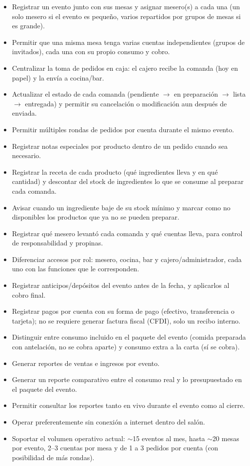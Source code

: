 \begin{itemize}
    \item Registrar un evento junto con sus mesas y asignar mesero(s) a cada una (un solo mesero si el evento es pequeño, varios repartidos por grupos de mesas si es grande).
    \item Permitir que una misma mesa tenga varias cuentas independientes (grupos de invitados), cada una con su propio consumo y cobro.
    \item Centralizar la toma de pedidos en caja: el cajero recibe la comanda (hoy en papel) y la envía a cocina/bar.
    \item Actualizar el estado de cada comanda (pendiente $\rightarrow$ en preparación $\rightarrow$ lista $\rightarrow$ entregada) y permitir su cancelación o modificación aun después de enviada.
    \item Permitir múltiples rondas de pedidos por cuenta durante el mismo evento.
    \item Registrar notas especiales por producto dentro de un pedido cuando sea necesario.
    \item Registrar la receta de cada producto (qué ingredientes lleva y en qué cantidad) y descontar del stock de ingredientes lo que se consume al preparar cada comanda.
    \item Avisar cuando un ingrediente baje de su stock mínimo y marcar como no disponibles los productos que ya no se pueden preparar.
    \item Registrar qué mesero levantó cada comanda y qué cuentas lleva, para control de responsabilidad y propinas.
    \item Diferenciar accesos por rol: mesero, cocina, bar y cajero/administrador, cada uno con las funciones que le corresponden.
    \item Registrar anticipos/depósitos del evento antes de la fecha, y aplicarlos al cobro final.
    \item Registrar pagos por cuenta con su forma de pago (efectivo, transferencia o tarjeta); no se requiere generar factura fiscal (CFDI), solo un recibo interno.
    \item Distinguir entre consumo incluido en el paquete del evento (comida preparada con antelación, no se cobra aparte) y consumo extra a la carta (sí se cobra).
    \item Generar reportes de ventas e ingresos por evento.
    \item Generar un reporte comparativo entre el consumo real y lo presupuestado en el paquete del evento.
    \item Permitir consultar los reportes tanto en vivo durante el evento como al cierre.
    \item Operar preferentemente sin conexión a internet dentro del salón.
    \item Soportar el volumen operativo actual: $\sim$15 eventos al mes, hasta $\sim$20 mesas por evento, 2--3 cuentas por mesa y de 1 a 3 pedidos por cuenta (con posibilidad de más rondas).
\end{itemize}

